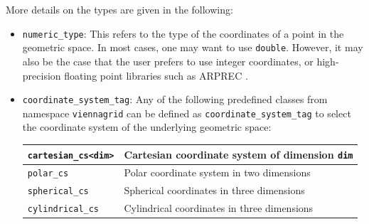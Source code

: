 More details on the types are given in the following:
\begin{itemize}
 \item \lstinline|numeric_type|: This refers to the type of the coordinates of a point in the geometric space. In most cases, one may want to use \lstinline|double|. However, it may also be the case that the user prefers to use integer coordinates, or high-precision floating point libraries such as ARPREC \cite{arprec}.

 \item \lstinline|coordinate_system_tag|: Any of the following predefined classes from namespace \lstinline|viennagrid| can be defined as \lstinline|coordinate_system_tag| to select the coordinate system of the underlying geometric space:
   \begin{center}
   \begin{tabular}{|l|l|}
    \hline
    \lstinline|cartesian_cs<dim>|   &  Cartesian coordinate system of dimension \lstinline|dim| \\
    \hline
    \lstinline|polar_cs|       &  Polar coordinate system in two dimensions \\
    \hline
    \lstinline|spherical_cs|   &  Spherical coordinates in three dimensions \\
    \hline 
    \lstinline|cylindrical_cs| &  Cylindrical coordinates in three dimensions \\
    \hline
   \end{tabular}
   \end{center}


\end{itemize}
